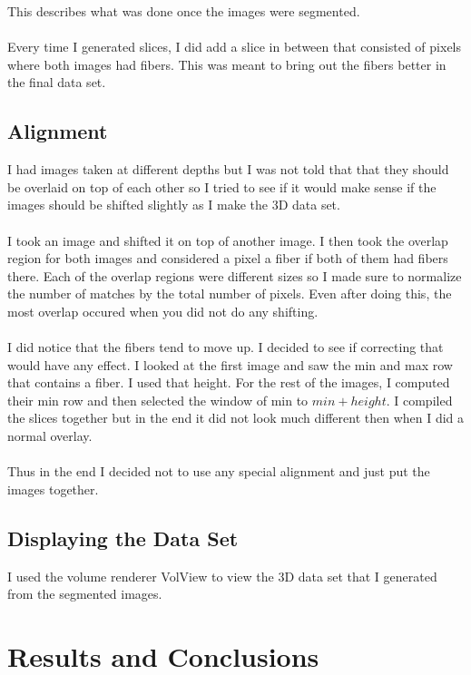 \documentclass[11pt,psfig]{article}
\begin{document}
This describes what was done once the images were segmented. \\
\\
Every time I generated slices, I did add a slice in between that consisted of pixels where both images had fibers. This was meant to bring out the fibers better in the final data set. 

\subsection*{Alignment}

I had images taken at different depths but I was not told that that they should be overlaid on top of each other so I tried to see if it would make sense if the images should be shifted slightly as I make the 3D data set. \\
\\
I took an image and shifted it on top of another image. I then took the overlap region for both images and considered a pixel a fiber if both of them had fibers there. Each of the overlap regions were different sizes so I made sure to normalize the number of matches by the total number of pixels. Even after doing this, the most overlap occured when you did not do any shifting. \\
\\
I did notice that the fibers tend to move up. I decided to see if correcting that would have any effect. I looked at the first image and saw the min and max row that contains a fiber. I used that height. For the rest of the images, I computed their min row and then selected the window of min to $min+height$. I compiled the slices together but in the end it did not look much different then when I did a normal overlay. \\
\\
Thus in the end I decided not to use any special alignment and just put the images together. 

\subsection*{Displaying the Data Set}

I used the volume renderer VolView to view the 3D data set that I generated from the segmented images. 

\section*{Results and Conclusions}
\end{document}

